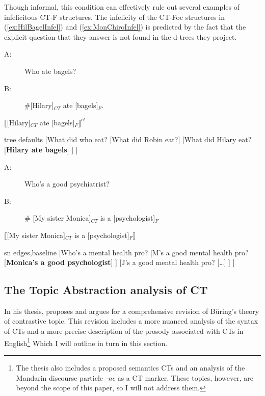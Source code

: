 \documentclass[
]{RCL}
\begin{document}
Though informal, this condition can effectively rule out several examples of infelicitous CT-F structures.
The infelicity of the CT-Foc structures in (\ref{ex:HilBagelInfel}) and (\ref{ex:MonChiroInfel}) is predicted by the fact that the explicit question that they answer is not found in the d-trees they project. 
\begin{exe}
	\ex\label{ex:HilBagelInfel} 
	\begin{xlist}
		\ex
			\begin{description}
				\item[A:] Who ate bagels?
				\item[B:] \#[Hilary]$_{CT}$ ate [bagels]$_F$.
			\end{description}
		\ex $\llbracket$[Hilary]$_{CT}$ ate [bagels]$_F\rrbracket^{ct}$\\
		\begin{forest}
		  tree defaults
		  [What did who eat?
		    [What did Robin eat?]
		    [What did Hilary eat?
		      [\textbf{Hilary ate bagels}]
		    ]
		  ]
		\end{forest}
	\end{xlist}
	\ex\label{ex:MonChiroInfel}
	\begin{xlist}
		\ex
		\begin{description}
			\item[A:] Who's a good psychiatrist?
			\item[B:]\# [My sister Monica]$_{CT}$ is a [psychologist]$_{F}$
		\end{description}
		\ex $\llbracket$[My sister Monica]$_{CT}$ is a [psychologist]$_{F}\rrbracket$\\
		\begin{forest}
			sn edges,baseline
		  [Who's a mental health pro?
		    [M's a good mental health pro?
		      [\textbf{Monica's a good psychologist}]
		    ]
		    [J's a good mental health pro?
		      [\ldots]
		    ]
		  ]
		\end{forest}	
	\end{xlist}
\end{exe}

\subsection{The Topic Abstraction analysis of CT \citep{constant2014diss}}\label{sec:Constant}
In his thesis, \citet{constant2014diss} proposes and argues for a comprehensive revision of B\"uring's theory of contrastive topic.
This revision includes a more nuanced analysis of the syntax of CTs and a more precise description of the prosody associated with CTs in English\footnote{
	The thesis also includes a proposed semantics CTs and an analysis of the Mandarin discourse particle \textit{-ne} as a CT marker.
	These topics, however, are beyond the scope of this paper, so I will not address them.
} Which I will outline in turn in this section.
\end{document}
